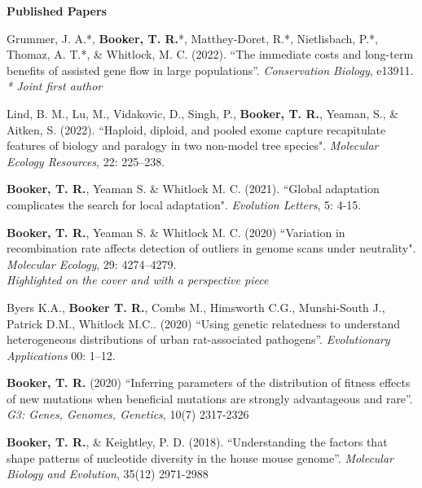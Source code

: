 \documentclass[11pt]{article}
\makeatletter
\newlength{\bibhang}
\newlength{\bibsep}
 {\@listi \global\bibsep\itemsep \global\advance\bibsep by\parsep}
\newenvironment{bibsection}%
        {\begin{etaremune}{}{%
       \setlength{\leftmargin}{\bibhang}%
       \setlength{\itemindent}{-\leftmargin}%
       \setlength{\itemsep}{\bibsep}%
       \setlength{\parsep}{\z@}%
        \setlength{\partopsep}{0pt}%
        \setlength{\topsep}{0pt}}}
        {\end{etaremune}\vspace{-.6\baselineskip}}
\makeatother
\begin{document}
\vspace{.1275in}
\textbf{Published Papers}

\begin{bibsection}

	\item Grummer, J. A.*, \textbf{Booker, T. R.}*, Matthey-Doret, R.*, Nietlisbach, P.*, Thomaz, A. T.*, \& Whitlock, M. C. (2022). ``The immediate costs and long-term benefits of assisted gene flow in large populations''. \textit{Conservation Biology}, e13911.\\
     \emph{* Joint first author}

      \item Lind, B. M., Lu, M., Vidakovic, D., Singh, P., { \bf Booker, T. R.}, Yeaman, S., \& Aitken, S. (2022). ``Haploid, diploid, and pooled exome capture recapitulate features of biology and paralogy in two non-model tree species". \emph{Molecular Ecology Resources}, 22: 225–238. 
  
    \item {\bf Booker, T. R.}, Yeaman S. \& Whitlock M. C. (2021). ``Global adaptation complicates the search for local adaptation".  \emph{Evolution Letters}, 5: 4-15. 

    \item {\bf Booker, T. R.}, Yeaman S. \& Whitlock M. C. (2020) ``Variation in recombination rate affects detection of outliers in genome scans under neutrality". \emph{Molecular Ecology}, 29: 4274–4279.\\ \emph{Highlighted on the cover and with a perspective piece}

	\item Byers K.A., {\bf Booker T. R.}, Combs M., Himsworth C.G., Munshi-South J., Patrick D.M., Whitlock M.C.. (2020)  ``Using genetic relatedness to understand heterogeneous distributions of urban rat-associated pathogens''. \emph{Evolutionary Applications} 00: 1–12.
   
    \item {\bf Booker, T. R.} (2020) ``Inferring parameters of the distribution of fitness effects of new mutations when beneficial mutations are strongly advantageous and rare''. \\
     \emph{G3: Genes, Genomes, Genetics}, 10(7) 2317-2326

    \item {\bf Booker, T. R.}, \& Keightley, P. D. (2018). ``Understanding the factors that shape patterns of nucleotide diversity in the house mouse genome''. \emph{Molecular Biology and Evolution}, 35(12) 2971-2988
    

\end{bibsection}
\end{document}
